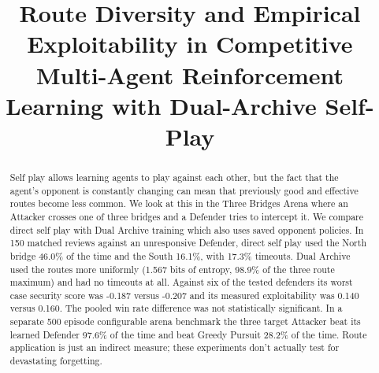 \documentclass[conference]{IEEEtran}
\begin{document}
 

\title{Route Diversity and Empirical Exploitability in Competitive Multi-Agent Reinforcement Learning with Dual-Archive Self-Play} 

\author {
\and 
{} 
\and 
{} 
\and 
{} 
} 

\maketitle 

\begin{abstract} 
Self play allows learning agents to play against each other, but the fact that the agent's opponent is constantly changing can mean that previously good and effective routes become less common. We look at this in the Three Bridges Arena where an Attacker crosses one of three bridges and a Defender tries to intercept it. We compare direct self play with Dual Archive training which also uses saved opponent policies. In 150 matched reviews against an unresponsive Defender, direct self play used the North bridge 46.0\% of the time and the South 16.1\%, with 17.3\% timeouts. Dual Archive used the routes more uniformly (1.567 bits of entropy, 98.9\% of the three route maximum) and had no timeouts at all. Against six of the tested defenders its worst case security score was -0.187 versus -0.207 and its measured exploitability was 0.140 versus 0.160. The pooled win rate difference was not statistically significant. In a separate 500 episode configurable arena benchmark the three target Attacker beat its learned Defender 97.6\% of the time and beat Greedy Pursuit 28.2\% of the time. Route application is just an indirect measure; these experiments don't actually test for devastating forgetting. 
\end{abstract} 
\end{document}
